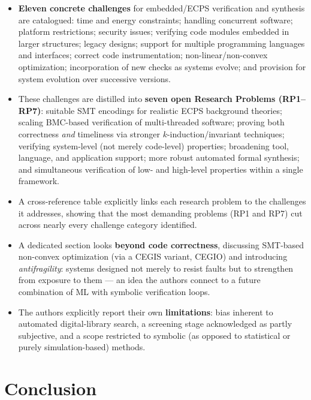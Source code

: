 \documentclass[12pt,a4paper]{article}
\begin{document}
\begin{itemize}[leftmargin=1.8cm]
  \item \textbf{Eleven concrete challenges} for embedded/ECPS verification and synthesis are
  catalogued: time and energy constraints; handling concurrent software; platform restrictions;
  security issues; verifying code modules embedded in larger structures; legacy designs;
  support for multiple programming languages and interfaces; correct code instrumentation;
  non-linear/non-convex optimization; incorporation of new checks as systems evolve; and
  provision for system evolution over successive versions.
  \item These challenges are distilled into \textbf{seven open Research Problems (RP1--RP7)}:
  suitable SMT encodings for realistic ECPS background theories; scaling BMC-based verification
  of multi-threaded software; proving both correctness \emph{and} timeliness via stronger
  $k$-induction/invariant techniques; verifying system-level (not merely code-level) properties;
  broadening tool, language, and application support; more robust automated formal synthesis;
  and simultaneous verification of low- and high-level properties within a single framework.
  \item A cross-reference table explicitly links each research problem to the challenges it
  addresses, showing that the most demanding problems (RP1 and RP7) cut across nearly every
  challenge category identified.
  \item A dedicated section looks \textbf{beyond code correctness}, discussing SMT-based
  non-convex optimization (via a CEGIS variant, CEGIO) and introducing \emph{antifragility}:
  systems designed not merely to resist faults but to strengthen from exposure to them --- an
  idea the authors connect to a future combination of ML with symbolic verification loops.
  \item The authors explicitly report their own \textbf{limitations}: bias inherent to
  automated digital-library search, a screening stage acknowledged as partly subjective, and a
  scope restricted to symbolic (as opposed to statistical or purely simulation-based) methods.
\end{itemize}

\section{Conclusion}
\end{document}
